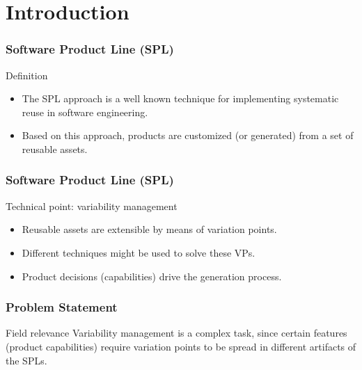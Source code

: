 \documentclass{beamer}
\begin{document}
\section{Introduction}

\begin{frame}
\frametitle{Software Product Line (SPL)}

\begin{block}{Definition}
\begin{itemize}
  \item The SPL approach is a well known technique for implementing systematic
  reuse in software engineering.
  \item Based on this approach, products are customized (or generated) from a
  set of reusable assets.
\end{itemize}
\end{block}
\end{frame}

\begin{frame}
\frametitle{Software Product Line (SPL)}

\begin{block}{Technical point: variability management}
\begin{itemize}
  \item Reusable assets are extensible by means of variation points.
  \item Different techniques might be used to solve these VPs.
  \item Product decisions (capabilities) drive the generation process.
\end{itemize}
\end{block}


\end{frame}

\begin{frame}
\frametitle{Problem Statement}

\begin{block}{Field relevance}
Variability management is a complex task, since certain features (product
capabilities) require variation points to be spread in different artifacts of 
the SPLs.
\end{block}

\end{frame}
\end{document}
